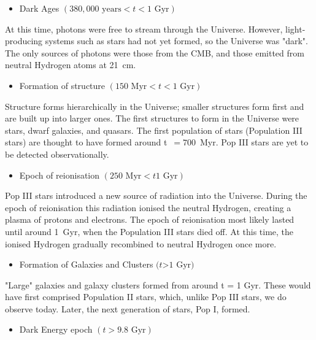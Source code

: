\documentclass[11pt,a4paper]{book}
\providecommand{\tightlist}{%
  \setlength{\itemsep}{0pt}\setlength{\parskip}{0pt}}
\begin{document}
\begin{itemize}
\tightlist
\item
  Dark Ages \((380,000 \text{ years}< t < 1\text{ Gyr})\)
\end{itemize}

At this time, photons were free to stream through the Universe. However,
light-producing systems such as stars had not yet formed, so the
Universe was "dark". The only sources of photons were those from the
CMB, and those emitted from neutral Hydrogen atoms at 21~cm.

\begin{itemize}
\tightlist
\item
  Formation of structure \((150\text{ Myr} < t < 1\text{ Gyr})\)
\end{itemize}

Structure forms hierarchically in the Universe; smaller structures form
first and are built up into larger ones. The first structures to form in
the Universe were stars, dwarf galaxies, and quasars. The first
population of stars (Population III stars) are thought to have formed
around t~\(=700\)~Myr. Pop III stars are yet to be detected
observationally.

\begin{itemize}
\tightlist
\item
  Epoch of reionisation \((250 \text{ Myr} < t 1\text{ Gyr})\)
\end{itemize}

Pop III stars introduced a new source of radiation into the Universe.
During the epoch of reionisation this radiation ionised the neutral
Hydrogen, creating a plasma of protons and electrons. The epoch of
reionisation most likely lasted until around 1~Gyr, when the Population
III stars died off. At this time, the ionised Hydrogen gradually
recombined to neutral Hydrogen once more.

\begin{itemize}
\tightlist
\item
  Formation of Galaxies and Clusters \((t\)\textgreater{}\(1 \text{ Gyr})\)
\end{itemize}

"Large" galaxies and galaxy clusters formed from around t = 1 Gyr.
These would have first comprised Population II stars, which, unlike Pop
III stars, we do observe today. Later, the next generation of stars, Pop
I, formed.

\begin{itemize}
\tightlist
\item
  Dark Energy epoch \((t > 9.8 \text{ Gyr})\)
\end{itemize}
\end{document}
